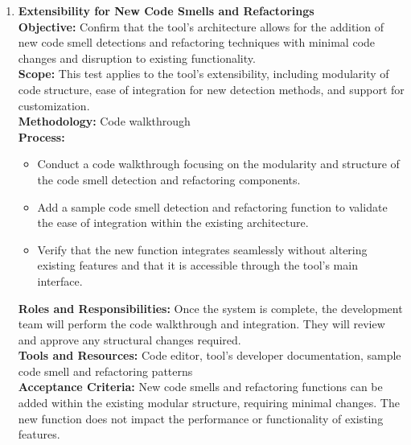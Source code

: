 \documentclass[12pt, titlepage]{article}
\begin{document}
\begin{enumerate}[label={\bf \textcolor{Maroon}{test-MS-\arabic*}}, wide=0pt, font=\itshape]
  \item \textbf{Extensibility for New Code Smells and Refactorings} \\[2mm]
    \textbf{Objective:} Confirm that the tool’s architecture allows for the addition of new code smell detections and refactoring techniques with minimal code changes and disruption to existing functionality. \\[2mm]
    \textbf{Scope:} This test applies to the tool’s extensibility, including modularity of code structure, ease of integration for new detection methods, and support for customization. \\[2mm]
    \textbf{Methodology:} Code walkthrough \\[2mm]
    \textbf{Process:}
    \begin{itemize}
      \item Conduct a code walkthrough focusing on the modularity and structure of the code smell detection and refactoring components.
      \item Add a sample code smell detection and refactoring function to validate the ease of integration within the existing architecture.
      \item Verify that the new function integrates seamlessly without altering existing features and that it is accessible through the tool’s main interface.
    \end{itemize}
    \textbf{Roles and Responsibilities:} Once the system is complete, the development team will perform the code walkthrough and integration. They will review and approve any structural changes required. \\[2mm]
    \textbf{Tools and Resources:} Code editor, tool’s developer documentation, sample code smell and refactoring patterns \\[2mm]
    \textbf{Acceptance Criteria:} New code smells and refactoring functions can be added within the existing modular structure, requiring minimal changes. The new function does not impact the performance or functionality of existing features.



\end{enumerate}
\end{document}
